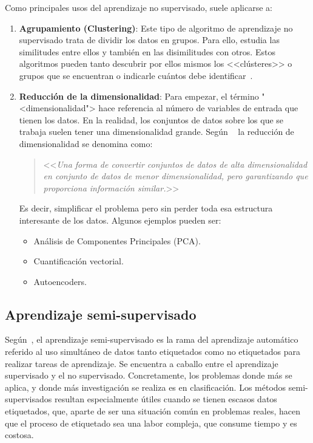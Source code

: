 Como principales usos del aprendizaje no supervisado, suele aplicarse a:
\vspace{-4px}
\begin{enumerate}
    \item \textbf{Agrupamiento (Clustering)}: Este tipo de algoritmo de
    aprendizaje no supervisado trata de dividir los datos en grupos. Para ello,
    estudia las similitudes entre ellos y también en las disimilitudes con
    otros. Estos algoritmos pueden tanto descubrir por ellos mismos los
    <<clústeres>> o grupos que se encuentran o indicarle cuántos debe
    identificar~\cite{salim:usl}.
    \item \textbf{Reducción de la dimensionalidad}: Para empezar, el término
    "<dimensionalidad"> hace referencia al número de variables de entrada que
    tienen los datos. En la realidad, los conjuntos de datos sobre los que se
    trabaja suelen tener una dimensionalidad grande. Según
   ~\cite{javatpoint:reduccionsdims} la reducción de dimensionalidad se denomina
    como: \begin{quote}<<\textit{Una forma de convertir conjuntos de datos de alta dimensionalidad en
    conjunto de datos de menor dimensionalidad, pero garantizando que proporciona
    información similar.}>>\end{quote} Es decir, simplificar el problema pero sin perder
    toda esa estructura interesante de los datos. Algunos ejemplos pueden ser:
    \begin{itemize}
        \item Análisis de Componentes Principales (PCA).
        \item Cuantificación vectorial.
        \item Autoencoders.
    \end{itemize}
\end{enumerate}

\subsection{Aprendizaje semi-supervisado}

Según~\cite{vanEngelen2020}, el aprendizaje semi-supervisado es la rama del
aprendizaje automático referido al uso simultáneo de datos tanto etiquetados
como no etiquetados para realizar tareas de aprendizaje. Se encuentra a caballo
entre el aprendizaje supervisado y el no supervisado. Concretamente, los
problemas donde más se aplica, y donde más investigación se realiza es en
clasificación. Los métodos semi-supervisados resultan especialmente útiles
cuando se tienen escasos datos etiquetados, que, aparte de ser una situación
común en problemas reales, hacen que el proceso de etiquetado sea una labor
compleja, que consume tiempo y es costosa.

